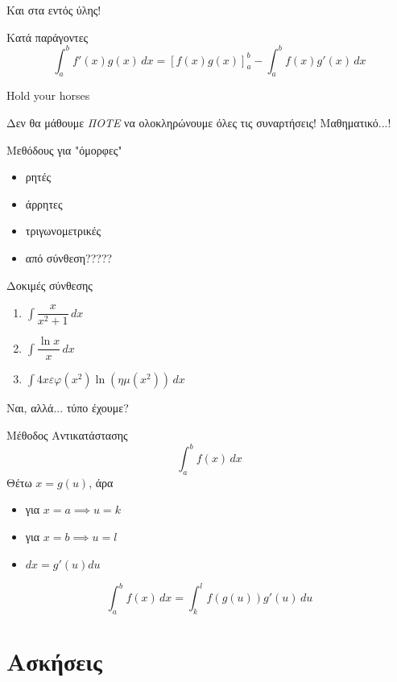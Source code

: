 \documentclass[greek]{beamer}
\begin{document}
\begin{frame}{Και στα εντός ύλης!}
 \begin{block}{Κατά παράγοντες}
  $$\int_a^b f'(x)g(x)\,dx=\left[ f(x)g(x) \right]_a^b -\int_a^b f(x)g'(x)\,dx$$
 \end{block}
\end{frame}

\begin{frame}{Hold your horses}

 Δεν θα μάθουμε \emph{ΠΟΤΕ} να ολοκληρώνουμε όλες τις συναρτήσεις! Μαθηματικό...!

 Μεθόδους για "όμορφες"

 \begin{itemize}
  \item<2-> ρητές
  \item<3-> άρρητες
  \item<4-> τριγωνομετρικές
  \item<5-> από σύνθεση?????
 \end{itemize}

\end{frame}

\begin{frame}{Δοκιμές σύνθεσης}
 \begin{enumerate}
  \item<1-> $\int \dfrac{x}{x^2+1}\,dx$
  \item<2-> $\int \dfrac{\ln x}{x}\, dx$
  \item<3-> $\int 4xεφ(x^2)\ln (ημ(x^2))\, dx$
 \end{enumerate}

\end{frame}

\begin{frame}{Ναι, αλλά... τύπο έχουμε?}
 \begin{block}{Μέθοδος Αντικατάστασης}
   $$\int_a^b f(x)\, dx$$
   Θέτω $x=g(u)$, άρα
   \begin{itemize}
     \item για $x=a\implies u=k$
     \item για $x=b\implies u=l$
     \item $dx=g'(u)du$
   \end{itemize}
   $$\int_a^b f(x)\, dx=\int_{k}^{l} f(g(u))g'(u)\,du$$
 \end{block}

\end{frame}

\section{Ασκήσεις}
\end{document}
